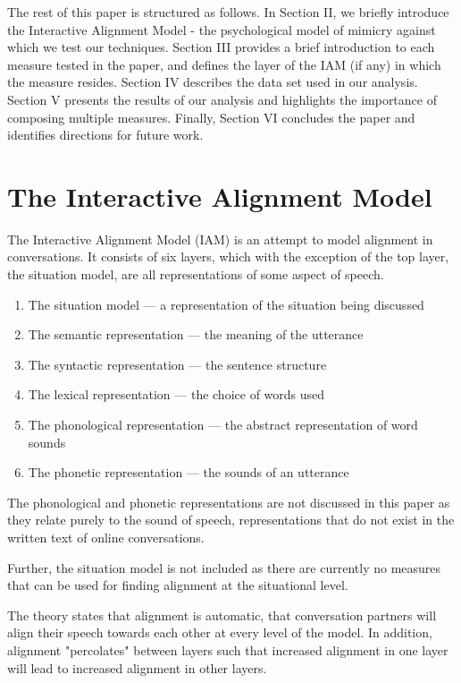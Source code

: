 \documentclass[conference]{IEEEtran}
\begin{document}
The rest of this paper is structured as follows. In Section II, we briefly introduce the Interactive Alignment Model - the psychological model of mimicry against which we test our techniques. Section III provides a brief introduction to each measure tested in the paper, and defines the layer of the IAM (if any) in which the measure resides. Section IV describes the data set used in our analysis. Section V presents the results of our analysis and highlights the importance of composing multiple measures. Finally, Section VI concludes the paper and identifies directions for future work.


\section{The Interactive Alignment Model}
The Interactive Alignment Model (IAM) \cite{pickering2004toward} is an attempt to model alignment in conversations. It consists of six layers, which with the exception of the top layer, the situation model, are all representations of some aspect of speech.

\begin{enumerate}
	\item The situation model --- a representation of the situation being discussed
	\item The semantic representation --- the meaning of the utterance
	\item The syntactic representation --- the sentence structure
	\item The lexical representation --- the choice of words used
	\item The phonological representation --- the abstract representation of word sounds
	\item The phonetic representation --- the sounds of an utterance
\end{enumerate}

The phonological and phonetic representations are not discussed in this paper as they relate purely to the sound of speech, representations that do not exist in the written text of online conversations.

Further, the situation model is not included as there are currently no measures that can be used for finding alignment at the situational level.

The theory states that alignment is automatic, that conversation partners will align their speech  towards each other at every level of the model. In addition, alignment "percolates" between layers such that increased alignment in one layer will lead to increased alignment in other layers.
\end{document}
